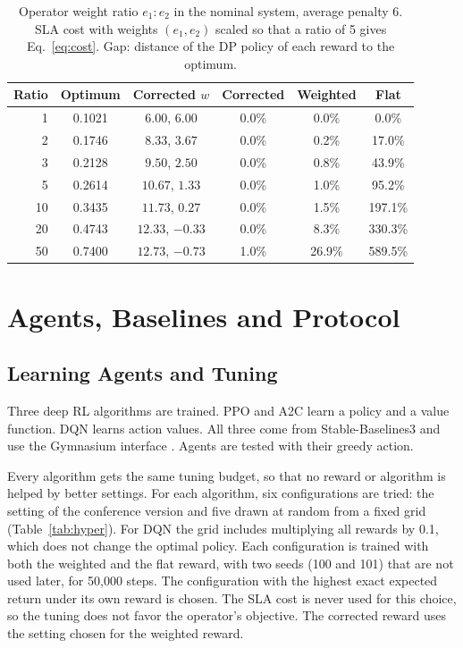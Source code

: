 \documentclass[journal]{IEEEtran}
\begin{document}
\begin{table}[t]
\caption{Operator weight ratio $e_1 : e_2$ in the nominal system, average penalty 6. SLA cost with weights $(e_1, e_2)$ scaled so that a ratio of 5 gives Eq.~\eqref{eq:cost}. Gap: distance of the DP policy of each reward to the optimum.}
\label{tab:ratios}
\centering
\footnotesize
\setlength{\tabcolsep}{2.5pt}
\begin{tabular}{@{}rccccc@{}}
\toprule
Ratio & Optimum & Corrected $w$ & Corrected & Weighted & Flat \\
\midrule
1 & 0.1021 & $6.00$, $6.00$ & 0.0\% & 0.0\% & 0.0\% \\
2 & 0.1746 & $8.33$, $3.67$ & 0.0\% & 0.2\% & 17.0\% \\
3 & 0.2128 & $9.50$, $2.50$ & 0.0\% & 0.8\% & 43.9\% \\
5 & 0.2614 & $10.67$, $1.33$ & 0.0\% & 1.0\% & 95.2\% \\
10 & 0.3435 & $11.73$, $0.27$ & 0.0\% & 1.5\% & 197.1\% \\
20 & 0.4743 & $12.33$, $-0.33$ & 0.0\% & 8.3\% & 330.3\% \\
50 & 0.7400 & $12.73$, $-0.73$ & 1.0\% & 26.9\% & 589.5\% \\
\bottomrule
\end{tabular}
\end{table}

\section{Agents, Baselines and Protocol}
\label{sec:method}

\subsection{Learning Agents and Tuning}
Three deep RL algorithms are trained. PPO \cite{schulman2017} and A2C \cite{mnih2016} learn a policy and a value function. DQN \cite{mnih2015} learns action values. All three come from Stable-Baselines3 \cite{raffin2021} and use the Gymnasium interface \cite{towers2024}. Agents are tested with their greedy action.

Every algorithm gets the same tuning budget, so that no reward or algorithm is helped by better settings. For each algorithm, six configurations are tried: the setting of the conference version and five drawn at random from a fixed grid (Table~\ref{tab:hyper}). For DQN the grid includes multiplying all rewards by 0.1, which does not change the optimal policy. Each configuration is trained with both the weighted and the flat reward, with two seeds (100 and 101) that are not used later, for 50,000 steps. The configuration with the highest exact expected return under its own reward is chosen. The SLA cost is never used for this choice, so the tuning does not favor the operator's objective. The corrected reward uses the setting chosen for the weighted reward.
\end{document}
